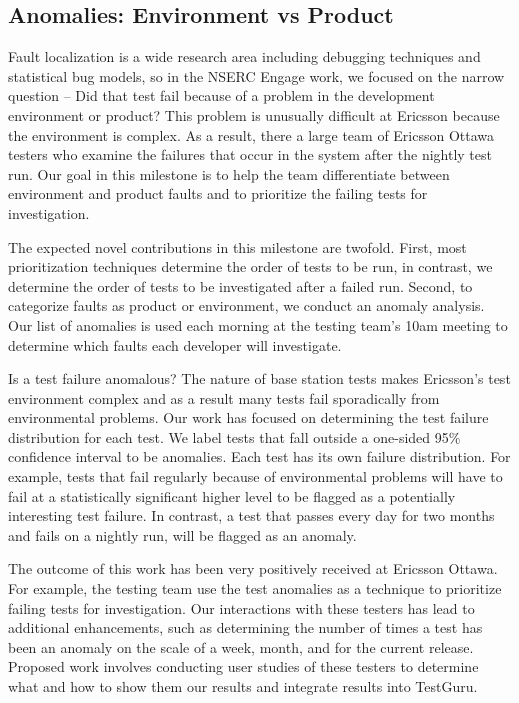 \subsection{Anomalies: Environment vs Product}

Fault localization is a wide research area including debugging techniques and statistical bug models, so in the NSERC Engage work, we focused on the narrow question -- Did that test fail because of a problem in the development environment or product? This problem is unusually difficult at Ericsson because the environment is complex. As a result, there a large team of Ericsson Ottawa testers who examine the failures that occur in the system after the nightly test run. Our goal in this milestone is to help the team differentiate between environment and product faults and to prioritize the failing tests for investigation.

The expected novel contributions in this milestone are twofold. First, most prioritization techniques determine the order of tests to be run, in contrast, we determine the order of tests to be investigated after a failed run. Second, to categorize faults as product or environment, we conduct an anomaly analysis. Our list of anomalies is used each morning at the testing team's 10am meeting to determine which faults each developer will investigate. 

Is a test failure anomalous? The nature of base station tests makes Ericsson's test environment complex and as a result many tests fail sporadically from environmental problems. Our work has focused on determining the test failure distribution for each test. We label tests that fall outside a one-sided 95\% confidence interval to be anomalies. Each test has its own failure distribution. For example, tests that fail regularly because of environmental problems will have to fail at a statistically significant higher level to be flagged as a potentially interesting test failure. In contrast, a test that passes every day for two months and fails on a nightly run, will be flagged as an anomaly. 

The outcome of this work has been very positively received at Ericsson Ottawa. For example, the testing team use the test anomalies as a technique to prioritize failing tests for investigation. Our interactions with these testers has lead to additional enhancements, such as determining the number of times a test has been an anomaly on the scale of a week, month, and for the current release. Proposed work involves conducting user studies of these testers to determine what and how to show them our results and integrate results into TestGuru. 

